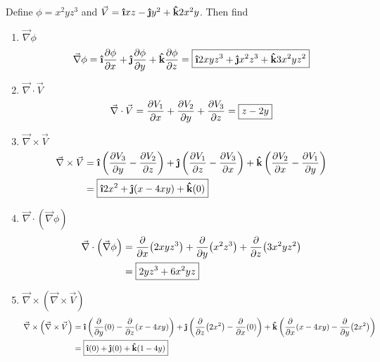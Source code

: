 \documentclass[11pt]{article}
\newcommand{\ihat}{\boldsymbol{\hat{\textbf{\i}}}}
\newcommand{\jhat}{\boldsymbol{\hat{\textbf{\j}}}}
\newcommand{\khat}{\boldsymbol{\hat{\textbf{k}}}}
\newcommand{\br}[1]{\left(#1\right)}
\begin{document}
Define $\phi = x^2yz^3$ and $\vec{V} = \ihat xz - \jhat y^2 + \khat 2x^2y$. Then find
\begin{enumerate}[label=(\alph*)]
    \item $\vec{\nabla}\phi$ \[\vec{\nabla}\phi = \ihat\pdv{\phi}{x} + \jhat\pdv{\phi}{y} + \khat\pdv{\phi}{z} = \boxed{\ihat 2xyz^3 + \jhat x^2z^3 + \khat 3x^2yz^2}\]
    \item $\vec{\nabla}\cdot \vec{V}$ \[\vec{\nabla}\cdot \vec{V} = \pdv{V_1}{x} + \pdv{V_2}{y} + \pdv{V_3}{z} = \boxed{z-2y}\]
    \item $\vec{\nabla}\times\vec{V}$ \begin{align*}\vec{\nabla}\times\vec{V} &= \ihat\br{\pdv{V_3}{y}- \pdv{V_2}{z}} + \jhat\br{\pdv{V_1}{z}-\pdv{V_3}{x}} + \khat\br{\pdv{V_2}{x}-\pdv{V_1}{y}} \\
    &= \boxed{\ihat 2x^2 + \jhat (x-4xy) + \khat (0)}\end{align*}
    \item $\vec{\nabla}\cdot\br{\vec{\nabla}\phi}$ \begin{align*}\vec{\nabla}\cdot\br{\vec{\nabla}\phi} &= \pdv{x}(2xyz^3) + \pdv{y}(x^2z^3) + \pdv{z}(3x^2yz^2)\\
    &= \boxed{2yz^3 + 6x^2yz}\end{align*}
    \item $\vec{\nabla}\times \br{\vec{\nabla}\times \vec{V}}$ \begin{align*} \vec{\nabla}\times \br{\vec{\nabla}\times \vec{V}} &= \ihat\br{\pdv{y}(0)-\pdv{z}(x-4xy)} + \jhat\br{\pdv{z}(2x^2)-\pdv{x}(0)} + \khat\br{\pdv{x}(x-4xy)-\pdv{y}(2x^2)}\\
    &= \boxed{\ihat(0) + \jhat(0) + \khat(1-4y)} \end{align*} 
\end{enumerate}
\end{document}
